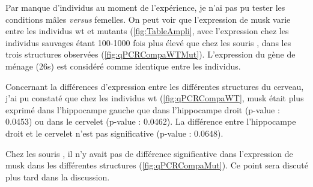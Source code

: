 	Par manque d'individus au moment de l'expérience, je n'ai pas pu tester les conditions mâles \emph{versus} femelles. On peut voir que l'expression de \gls{musk} varie entre les individus \gls{wt} et mutants (\cref{fig:TableAmpli}, avec l'expression chez les individus sauvages étant 100-1000 fois plus élevé que chez les souris \mcrd, dans les trois structures observées (\cref{fig:qPCRCompaWTMut}). L'expression du gène de ménage (\gls{26s}) est considéré comme identique entre les individus.
	
	Concernant la différences d'expression entre les différentes structures du cerveau, j'ai pu constaté que chez les individus \gls{wt} (\cref{fig:qPCRCompaWT}, \gls{musk} était plus exprimé dans l'hippocampe gauche que dans l'hippocampe droit (p-value : 0.0453) ou dans le cervelet (p-value : 0.0462). La différence entre l'hippocampe droit et le cervelet n'est pas significative (p-value : 0.0648).
	
	Chez les souris \mcrd, il n'y avait pas de différence significative dans l'expression de \gls{musk} dans les différentes structures (\cref{fig:qPCRCompaMut}). Ce point sera discuté plus tard dans la discussion.
	

